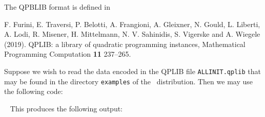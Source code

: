 \documentclass{galahad}
\begin{document}

\galmethod

\noindent
The QPBLIB format is defined in
\vspace*{1mm}

\noindent
F. Furini, E. Traversi, P. Belotti, A. Frangioni, A. Gleixner, N. Gould,
L. Liberti, A. Lodi, R. Misener, H. Mittelmann, N. V. Sahinidis,
S. Vigerske and A. Wiegele  (2019).
QPLIB: a library of quadratic programming instances,
Mathematical Programming Computation {\bf 11} 237–265.


\galexample
Suppose we wish to read the data encoded in the QPLIB file
{\tt ALLINIT.qplib} that may be found in the directory {\tt examples} of
the \libraryname\ distribution.
Then we may use the following code:

{\tt \small
\VerbatimInput{\packageexample}
}
\noindent
This produces the following output:
{\tt \small
\VerbatimInput{\packageresults}
}
\end{document}
